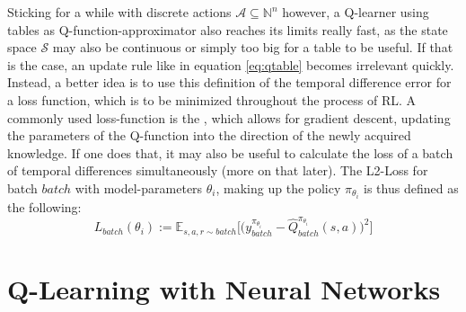 Sticking for a while with discrete actions $\mathcal{A} \subseteq \mathds{N}^n$ however, a Q-learner using tables as Q-function-approximator also reaches its limits really fast, as the state space $\mathcal{S}$ may also be continuous or simply too big for a table to be useful. If that is the case, an update rule like in equation \ref{eq:qtable} becomes irrelevant quickly. Instead, a better idea is to use this definition of the temporal difference error for a loss function, which is to be minimized throughout the process of RL. A commonly used loss-function is the , which allows for gradient descent, updating the parameters of the Q-function into the direction of the newly acquired knowledge. If one does that, it may also be useful to calculate the loss of a batch of temporal differences simultaneously (more on that later). The L2-Loss for batch $batch$ with model-parameters $\theta_i$, making up the policy $\pi_{\theta_i}$ is thus defined as the following: 
\begin{equation} \label{l2loss}
	L_{batch}(\theta_i) := \mathds{E}_{s,a,r \sim batch} \Big[ \big( y_{batch}^{\pi_{\theta_i}} - \hat{Q}_{batch}^{\pi_{\theta_i}}(s, a)\big)^2 \Big]
\end{equation}







%

\section{Q-Learning with Neural Networks}

